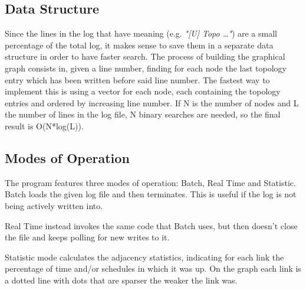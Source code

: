 \subsection{Data Structure}
Since the lines in the log that have meaning (e.g. \textit{"[U] Topo \dots"}) are a small percentage of the total log, it makes sense to save them in a separate data structure in order to have faster search. The process of building the graphical graph consists in, given a line number, finding for each node the last topology entry which has been written before said line number. The fastest way to implement this is using a vector for each node, each containing the topology entries and ordered by increasing line number. If N is the number of nodes and L the number of lines in the log file, N binary searches are needed, so the final result is O(N*log(L)).

\subsection{Modes of Operation}
The program features three modes of operation: Batch, Real Time and Statistic.
Batch loads the given log file and then terminates. This is useful if the log is not being actively written into.

Real Time instead invokes the same code that Batch uses, but then doesn't close the file and keeps polling for new writes to it.

Statistic mode calculates the adjacency statistics, indicating for each link the percentage of time and/or schedules in which it was up. On the graph each link is a dotted line with dots that are sparser the weaker the link was.

